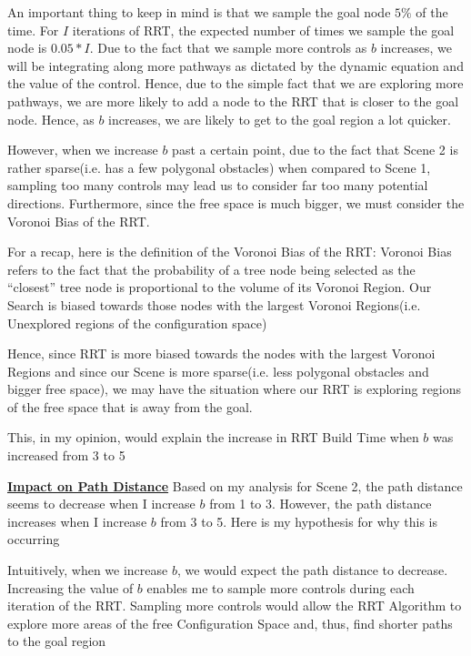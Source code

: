 \documentclass{article}
\begin{document}
An important thing to keep in mind is that we sample the goal node $5\%$ of the time. For $I$ iterations of RRT, the expected number of times we sample the goal node is $0.05 * I$. Due to the fact that we sample more controls as $b$ increases, we will be integrating along more pathways as dictated by the dynamic equation and the value of the control. Hence, due to the simple fact that we are exploring more pathways, we are more likely to add a node to the RRT that is closer to the goal node. Hence, as $b$ increases, we are likely to get to the goal region a lot quicker. \newline 

However, when we increase $b$ past a certain point, due to the fact that Scene 2 is rather sparse(i.e. has a few polygonal obstacles) when compared to Scene 1, sampling too many controls may lead us to consider far too many potential directions. Furthermore, since the free space is much bigger, we must consider the Voronoi Bias of the RRT. \newline 

For a recap, here is the definition of the Voronoi Bias of the RRT: Voronoi Bias refers to the fact that the probability of a tree node being selected as the “closest” tree node is proportional to the volume of its Voronoi Region. Our Search is biased towards those nodes with the largest Voronoi Regions(i.e. Unexplored regions of the configuration space)  \newline 

Hence, since RRT is more biased towards the nodes with the largest Voronoi Regions and since our Scene is more sparse(i.e. less polygonal obstacles and bigger free space), we may have the situation where our RRT is exploring regions of the free space that is away from the goal. \newline 

This, in my opinion, would explain the increase in RRT Build Time when $b$ was increased from 3 to 5 \newline 

\textbf{\underline{Impact on Path Distance}} \newline
Based on my analysis for Scene 2, the path distance seems to decrease when I increase $b$ from 1 to 3. However, the path distance increases when I increase $b$ from 3 to 5. Here is my hypothesis for why this is occurring \newline 

Intuitively, when we increase $b$, we would expect the path distance to decrease. Increasing the value of $b$ enables me to sample more controls during each iteration of the RRT. Sampling more controls would allow the RRT Algorithm to explore more areas of the free Configuration Space and, thus, find shorter paths to the goal region \newline 
\end{document}
